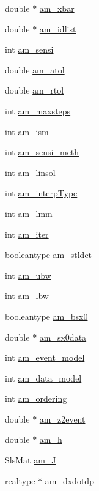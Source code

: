 \begin{DoxyCompactItemize}
\item 
double $\ast$ \hyperlink{struct_user_data_ad21f2b82715b051daf2775ed059afdbb}{am\+\_\+xbar}
\item 
double $\ast$ \hyperlink{struct_user_data_ab62bd78b1593ddbf3d854356b4dcaa0f}{am\+\_\+idlist}
\item 
int \hyperlink{struct_user_data_a3bd631d595b8a864de83f25a1756ce3d}{am\+\_\+sensi}
\item 
double \hyperlink{struct_user_data_a2aade90998d7e2cefa7953d4fdbc438b}{am\+\_\+atol}
\item 
double \hyperlink{struct_user_data_a2370b78f280747d84a69619ea8c55985}{am\+\_\+rtol}
\item 
int \hyperlink{struct_user_data_a0187950731c16f2857d0cd5b92416352}{am\+\_\+maxsteps}
\item 
int \hyperlink{struct_user_data_a1f2514c0ee00da61ade386173b718a02}{am\+\_\+ism}
\item 
int \hyperlink{struct_user_data_a83bc6716ecf3decb3d963929361fcd6d}{am\+\_\+sensi\+\_\+meth}
\item 
int \hyperlink{struct_user_data_a03fa52449ab4bb9a1a75312fd9064db1}{am\+\_\+linsol}
\item 
int \hyperlink{struct_user_data_a02adc800558b1cdac3fa8bc96e65dbbb}{am\+\_\+interp\+Type}
\item 
int \hyperlink{struct_user_data_a18b6fbc6159783acab9b5f4b106077cd}{am\+\_\+lmm}
\item 
int \hyperlink{struct_user_data_a2e0183eade68209e6835d3199054f0cc}{am\+\_\+iter}
\item 
booleantype \hyperlink{struct_user_data_a7d39c238c319f0164a15744950bfd021}{am\+\_\+stldet}
\item 
int \hyperlink{struct_user_data_a7283826ef630f92bb04052eb79a377e5}{am\+\_\+ubw}
\item 
int \hyperlink{struct_user_data_a0fd271dea83e804c7b1ef82a2b0ab76c}{am\+\_\+lbw}
\item 
booleantype \hyperlink{struct_user_data_a87d2f917b1bea7fea2d5878ccd43c7db}{am\+\_\+bsx0}
\item 
double $\ast$ \hyperlink{struct_user_data_a7ac27602345668b3a2bcabac4c7af733}{am\+\_\+sx0data}
\item 
int \hyperlink{struct_user_data_ace3cae0f78a3365a5fac7d7daa9928ff}{am\+\_\+event\+\_\+model}
\item 
int \hyperlink{struct_user_data_a83373144a2adb9f97cdfca2dfc79ce80}{am\+\_\+data\+\_\+model}
\item 
int \hyperlink{struct_user_data_a260a14e35469f1516b194f4f065a9794}{am\+\_\+ordering}
\item 
double $\ast$ \hyperlink{struct_user_data_af16fc75b57c68ab1d3784cc71ab073a9}{am\+\_\+z2event}
\item 
double $\ast$ \hyperlink{struct_user_data_a1a976a80dc74446059468485a0f279e1}{am\+\_\+h}
\item 
Sls\+Mat \hyperlink{struct_user_data_a822be7d2872832008aa0b7c0282b04f6}{am\+\_\+\+J}
\item 
realtype $\ast$ \hyperlink{struct_user_data_a04716137a064f7c6d85c04aeb235b4f0}{am\+\_\+dxdotdp}
\end{DoxyCompactItemize}



